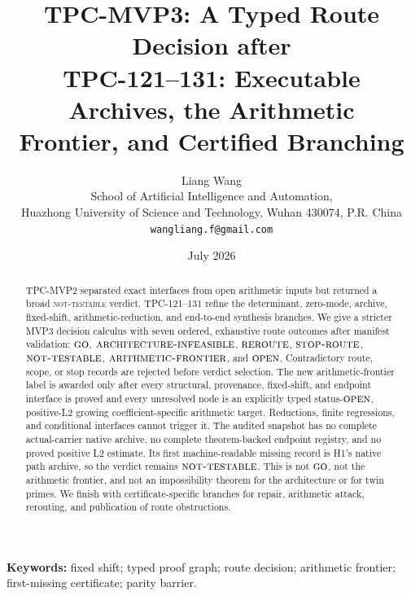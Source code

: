 \documentclass[11pt]{article}
\title{\textbf{TPC-MVP3: A Typed Route Decision after}\\
\textbf{TPC-121--131: Executable Archives, the Arithmetic}\\
\textbf{Frontier, and Certified Branching}}
\author{Liang Wang\\
School of Artificial Intelligence and Automation,\\
Huazhong University of Science and Technology, Wuhan 430074, P.R. China\\
\texttt{wangliang.f@gmail.com}}
\date{July 2026}
\theoremstyle{definition}
\theoremstyle{remark}
\begin{document}
\maketitle

\begin{abstract}
TPC-MVP2 separated exact interfaces from open arithmetic inputs but
returned a broad \textsc{not-testable} verdict.  TPC-121--131 refine
the determinant, zero-mode, archive, fixed-shift, arithmetic-reduction,
and end-to-end synthesis branches.  We give a stricter MVP3 decision
calculus with seven ordered, exhaustive route outcomes after manifest
validation:
\(\textsc{go}\), \(\textsc{architecture-infeasible}\),
\(\textsc{reroute}\), \(\textsc{stop-route}\),
\(\textsc{not-testable}\), \(\textsc{arithmetic-frontier}\), and
\(\textsc{open}\).  Contradictory route, scope, or stop records are
rejected before verdict selection.  The new arithmetic-frontier label is awarded only
after every structural, provenance, fixed-shift, and endpoint
interface is proved and every unresolved node is an explicitly typed
status-\(\textsc{open}\), positive-L2 growing
coefficient-specific arithmetic target.  Reductions,
finite regressions, and conditional interfaces cannot trigger it.
The audited snapshot has no complete actual-carrier native archive,
no complete theorem-backed endpoint registry, and no proved positive
L2 estimate.  Its first machine-readable missing record is H1's
native path archive, so the verdict remains
\(\textsc{not-testable}\).  This is not \(\textsc{go}\), not the
arithmetic frontier, and not an impossibility theorem for the
architecture or for twin primes.  We finish with certificate-specific
branches for repair, arithmetic attack, rerouting, and publication of
route obstructions.
\end{abstract}

\noindent\textbf{Keywords:} fixed shift; typed proof graph; route
decision; arithmetic frontier; first-missing certificate; parity
barrier.

\medskip
\noindent{}
\end{document}
